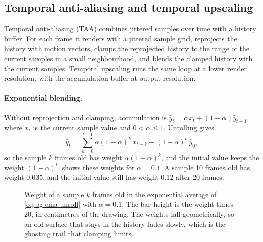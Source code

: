 \subsection{Temporal anti-aliasing and temporal upscaling}\label{sec:bg-taa}

Temporal anti-aliasing (TAA) \cite{yang2020taasurvey} combines jittered samples over time with a history buffer. For each frame it renders with a jittered sample grid, reprojects the history with motion vectors, clamps the reprojected history to the range of the current samples in a small neighbourhood, and blends the clamped history with the current samples. Temporal upscaling runs the same loop at a lower render resolution, with the accumulation buffer at output resolution.

\paragraph{Exponential blending.} Without reprojection and clamping, accumulation is $\hat y_t=\alpha x_t+(1-\alpha)\hat y_{t-1}$, where $x_t$ is the current sample value and $0<\alpha\le1$. Unrolling gives
\begin{equation}
\hat y_t=\sum_{k=0}^{t-1}\alpha(1-\alpha)^k\,x_{t-k}+(1-\alpha)^t\,\hat y_0,\label{eq:bg-ema-unroll}
\end{equation}
so the sample $k$ frames old has weight $\alpha(1-\alpha)^k$, and the initial value keeps the weight $(1-\alpha)^t$.  shows these weights for $\alpha=0.1$. A sample 10 frames old has weight $0.035$, and the initial value still has weight $0.12$ after 20 frames.

\begin{figure}[!htbp]
\centering
{}
\caption{Weight of a sample $k$ frames old in the exponential average of \cref{eq:bg-ema-unroll} with $\alpha=0.1$. The bar height is the weight times 20, in centimetres of the drawing. The weights fall geometrically, so an old surface that stays in the history fades slowly, which is the ghosting trail that clamping limits.}\label{fig:bg-ema}
\end{figure}

